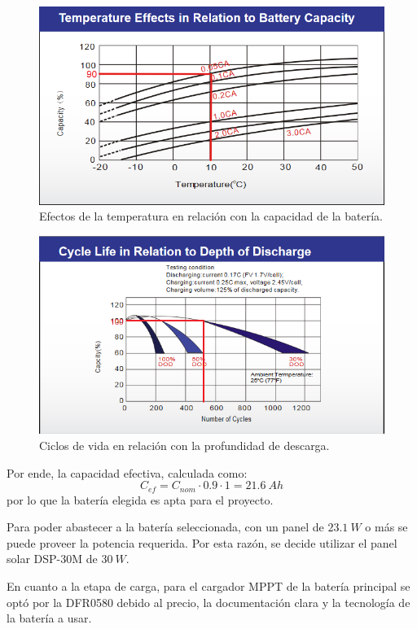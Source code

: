 \begin{figure}[H]
	\centering
	\includegraphics[width=0.9\linewidth]{ImagenesFactibilidad/UL24-12_Ctemp}	
	\caption{Efectos de la temperatura en relación con la capacidad de la batería.}
	\label{fig:ctemp}
\end{figure}

\begin{figure}[H]
	\centering
	\includegraphics[width=0.9\linewidth]{ImagenesFactibilidad/UL24-12_Cdod}	
	\caption{Ciclos de vida en relación con la profundidad de descarga.}
	\label{fig:cdod}
\end{figure}

Por ende, la capacidad efectiva, calculada como:
\begin{equation}
C_{ef} = C_{nom} \cdot 0.9 \cdot 1 = 21.6 \ Ah
\end{equation}
por lo que la batería elegida es apta para el proyecto.


Para poder abastecer a la batería seleccionada, con un panel de $23.1 \ W$ o más se puede proveer la potencia requerida. Por esta razón, se decide utilizar el panel solar DSP-30M de $30 \ W$.

En cuanto a la etapa de carga, para el cargador MPPT de la batería principal se optó por la DFR0580 debido al precio, la documentación clara y la tecnología de la batería a usar.
